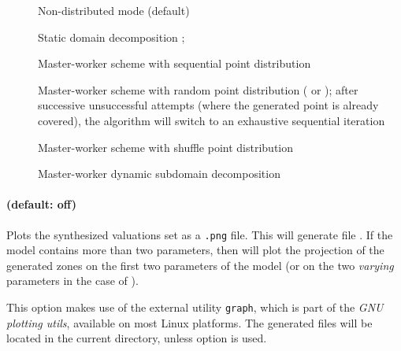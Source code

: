 \begin{description}
	\item[] Non-distributed mode (default)
	\item[] Static domain decomposition \cite{ACN15}; %
	\item[] Master-worker scheme with sequential point distribution \cite{ACE14}
	\item[] Master-worker scheme with random point distribution (\eg{}  or ); after  successive unsuccessful attempts (where the generated point is already covered), the algorithm will switch to an exhaustive sequential iteration \cite{ACE14}
	\item[] Master-worker scheme with shuffle point distribution \cite{ACN15}
	\item[] Master-worker dynamic subdomain decomposition \cite{ACN15}
\end{description}





\paragraph{ (default: off)}

Plots the synthesized valuations set as a \texttt{.png} file.
This will generate file .
If the model contains more than two parameters, then  will plot the projection of the generated zones on the first two parameters of the model (or on the two \emph{varying} parameters in the case of \BC{}).

This option makes use of the external utility \texttt{graph}, which is
part of the \emph{GNU plotting utils}, available on most Linux
platforms.
The generated files will be located in the current directory, unless option  is used.

